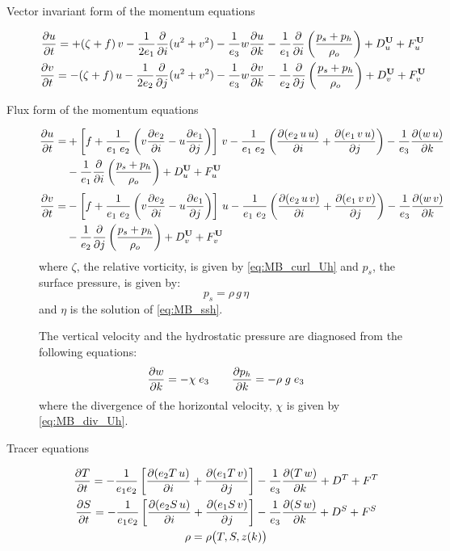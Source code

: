 \documentclass[../main/NEMO_manual]{subfiles}
\begin{document}
\begin{description}
\item [Vector invariant form of the momentum equations]
  \begin{equation}
    \label{eq:MB_dyn_vect}
    \begin{gathered}
      \pd[u]{t} = + (\zeta + f) \, v - \frac{1}{2 e_1} \pd[]{i} (u^2 + v^2) - \frac{1}{e_3} w \pd[u]{k} - \frac{1}{e_1} \pd[]{i} \lt( \frac{p_s + p_h}{\rho_o} \rt) + D_u^{\vect U} + F_u^{\vect U} \\
      \pd[v]{t} = - (\zeta + f) \, u - \frac{1}{2 e_2} \pd[]{j} (u^2 + v^2) - \frac{1}{e_3} w \pd[v]{k} - \frac{1}{e_2} \pd[]{j} \lt( \frac{p_s + p_h}{\rho_o} \rt) + D_v^{\vect U} + F_v^{\vect U}
    \end{gathered}
  \end{equation}
\item [Flux form of the momentum equations]
  \begin{alignat*}{2}
    \pd[u]{t} = &+ \lt[ f + \frac{1}{e_1 \; e_2} \lt( v \pd[e_2]{i} - u \pd[e_1]{j} \rt) \rt] \, v - \frac{1}{e_1 \; e_2} \lt( \pd[(e_2 \, u \, u)]{i} + \pd[(e_1 \, v \, u)]{j} \rt) - \frac{1}{e_3} \pd[(w \, u)]{k} \\
    &- \frac{1}{e_1} \pd[]{i} \lt( \frac{p_s + p_h}{\rho_o} \rt) + D_u^{\vect U} + F_u^{\vect U}
  \end{alignat*}
  \begin{alignat*}{2}
    \pd[v]{t} = &- \lt[ f + \frac{1}{e_1 \; e_2} \lt( v \pd[e_2]{i} - u \pd[e_1]{j} \rt) \rt] \, u - \frac{1}{e_1 \; e_2} \lt( \pd[(e_2 \, u \, v)]{i} + \pd[(e_1 \, v \, v)]{j} \rt) - \frac{1}{e_3} \pd[(w \, v)]{k} \\
    &- \frac{1}{e_2} \pd[]{j} \lt( \frac{p_s + p_h}{\rho_o} \rt) + D_v^{\vect U} + F_v^{\vect U}
  \end{alignat*}
  where $\zeta$, the relative vorticity, is given by \autoref{eq:MB_curl_Uh} and
  $p_s$, the surface pressure, is given by:
  \[
    p_s = \rho \,g \, \eta
  \]
  and $\eta$ is the solution of \autoref{eq:MB_ssh}.

  The vertical velocity and the hydrostatic pressure are diagnosed from the following equations:
  \[
    \pd[w]{k} = - \chi \; e_3 \qquad
    \pd[p_h]{k} = - \rho \; g \; e_3
  \]
  where the divergence of the horizontal velocity, $\chi$ is given by \autoref{eq:MB_div_Uh}.
\item [Tracer equations]
  \begin{gather*}
    \pd[T]{t} = - \frac{1}{e_1 e_2} \lt[ \pd[(e_2 T \, u)]{i} + \pd[(e_1 T \, v)]{j} \rt] - \frac{1}{e_3} \pd[(T \, w)]{k} + D^T + F^T \\
    \pd[S]{t} = - \frac{1}{e_1 e_2} \lt[ \pd[(e_2 S \, u)]{i} + \pd[(e_1 S \, v)]{j} \rt] - \frac{1}{e_3} \pd[(S \, w)]{k} + D^S + F^S \\
    \rho = \rho \big( T,S,z(k) \big)
  \end{gather*}
\end{description}
\end{document}
